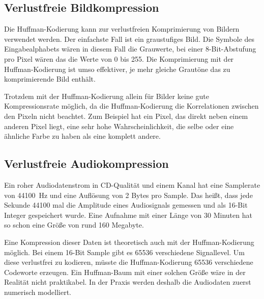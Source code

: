 \documentclass[twoside,11pt,a4paper]{article}
\theoremstyle{break}
\begin{document}
\subsection{Verlustfreie Bildkompression}
Die Huffman-Kodierung kann zur verlustfreien Komprimierung von Bildern
verwendet werden. Der einfachste Fall ist ein graustufiges Bild. Die
Symbole des Eingabealphabets wären in diesem Fall die Grauwerte, bei
einer 8-Bit-Abstufung pro Pixel wären das die Werte von 0 bis 255.
Die Komprimierung mit der Huffman-Kodierung ist umso effektiver, je
mehr gleiche Grautöne das zu komprimierende Bild enthält. \cite[S. 72
  f.]{Sayood:2006}

Trotzdem mit der Huffman-Kodierung allein für Bilder keine gute
Kompressionsrate möglich, da die Huffman-Kodierung die Korrelationen
zwischen den Pixeln nicht beachtet. Zum Beispiel hat ein Pixel, das
direkt neben einem anderen Pixel liegt, eine sehr hohe
Wahrscheinlichkeit, die selbe oder eine ähnliche Farbe zu haben als
eine komplett andere. \cite[S. 217 f.]{Salomon:2010}

\subsection{Verlustfreie Audiokompression}
Ein roher Audiodatenstrom in CD-Qualität und einem Kanal hat eine
Samplerate von 44100~Hz und eine Auflösung von 2 Bytes pro Sample. Das
heißt, dass jede Sekunde 44100 mal die Amplitude eines Audiosignals
gemessen und als 16-Bit Integer gespeichert wurde. Eine Aufnahme mit
einer Länge von 30 Minuten hat so schon eine Größe von rund 160
Megabyte.

Eine Kompression dieser Daten ist theoretisch auch mit der
Huffman-Kodierung möglich. Bei einem 16-Bit Sample gibt es 65536
verschiedene Signallevel. Um diese verlustfrei zu kodieren, müsste die
Huffman-Kodierung 65536 verschiedene Codeworte erzeugen. Ein
Huffman-Baum mit einer solchen Größe wäre in der Realität nicht
praktikabel. In der Praxis werden deshalb die Audiodaten zuerst
numerisch modelliert. \cite[S. 76]{Sayood:2006}

\clearpage
\renewcommand{\refname}{Literaturverzeichnis}
 
\end{document}
